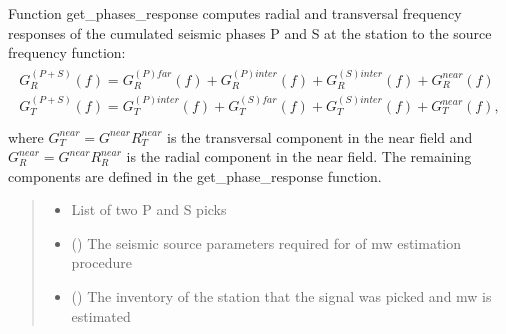 \documentclass[letterpaper,10pt,english]{sphinxmanual}
\begin{document}
\begin{fulllineitems}
\label{\detokenize{api_support:amw.mw.parameters.get_phases_response}}
\pysigstartsignatures
{}
\pysigstopsignatures
\sphinxAtStartPar
Function get\_phases\_response computes radial and transversal frequency responses
of the cumulated seismic phases P and S at the station to the source frequency function:
\begin{align*}\!\begin{aligned}
G_R^{(P+S)}\left(f\right)=G_R^{(P)far}\left(f\right)+G_R^{\left(P\right)inter}\left(f\right)
+G_R^{\left(S\right)inter}\left(f\right)+G_R^{near}\left(f\right)\\
G_T^{(P+S)}\left(f\right)=G_T^{\left(P\right)inter}\left(f\right)+G_T^{(S)far}\left(f\right)
+G_T^{\left(S\right)inter}\left(f\right)+G_T^{near}\left(f\right),\\
\end{aligned}\end{align*}
\sphinxAtStartPar
where
\(G_T^{near} = G^{near}R_T^{near}\)
is the transversal component in the near field
and \(G_R^{near} = G^{near}R_R^{near}\)
is the radial component in the near field.
The remaining components are defined in the get\_phase\_response function.
\begin{quote}\begin{description}
\begin{itemize}
\item {} 
\sphinxAtStartPar
{} \textendash{} List of two P and S picks

\item {} 
\sphinxAtStartPar
{} () \textendash{} The seismic source parameters required for of mw estimation procedure

\item {} 
\sphinxAtStartPar
{} () \textendash{} The inventory of the station that the signal was picked and mw is estimated


\end{itemize}
\end{description}
\end{quote}
\end{fulllineitems}
\end{document}
